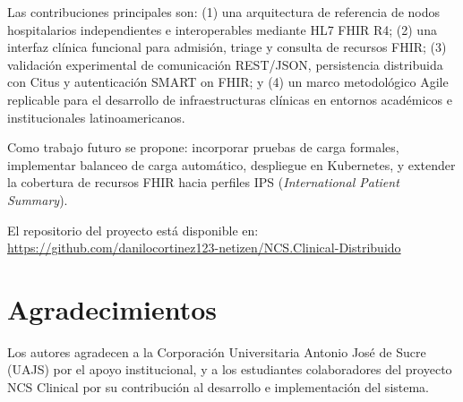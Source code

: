 \documentclass[conference]{IEEEtran}
\begin{document}
Las contribuciones principales son: (1) una arquitectura de referencia
de nodos hospitalarios independientes e interoperables mediante HL7
FHIR R4; (2) una interfaz cl\'inica funcional para admisi\'on, triage
y consulta de recursos FHIR; (3) validaci\'on experimental de
comunicaci\'on REST/JSON, persistencia distribuida con Citus y
autenticaci\'on SMART on FHIR; y (4) un marco metodol\'ogico Agile
replicable para el desarrollo de infraestructuras cl\'inicas en
entornos acad\'emicos e institucionales latinoamericanos.

Como trabajo futuro se propone: incorporar pruebas de carga formales,
implementar balanceo de carga autom\'atico, despliegue en Kubernetes,
y extender la cobertura de recursos FHIR hacia perfiles IPS
(\textit{International Patient Summary}).

El repositorio del proyecto est\'a disponible en:
\url{https://github.com/danilocortinez123-netizen/NCS.Clinical-Distribuido}

\section*{Agradecimientos}

Los autores agradecen a la Corporaci\'on Universitaria Antonio Jos\'e
de Sucre (UAJS) por el apoyo institucional, y a los estudiantes
colaboradores del proyecto NCS Clinical por su contribuci\'on al
desarrollo e implementaci\'on del sistema.
\end{document}

